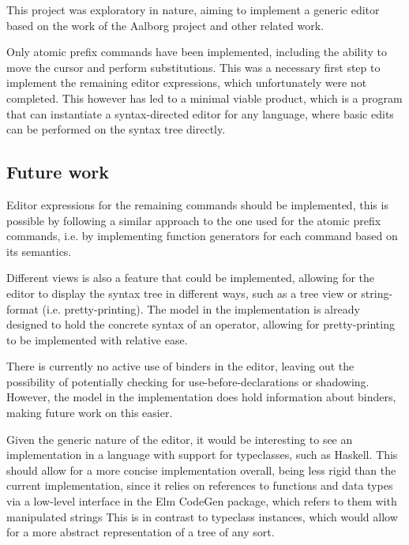 This project was exploratory in nature, aiming to implement a generic editor
based on the work of the Aalborg project\cite{aalborg} and other related work.

Only atomic prefix commands have been implemented, including the ability to
move the cursor and perform substitutions. This was a necessary first step
to implement the remaining editor expressions, which unfortunately were not
completed. This however has led to a minimal viable product, which is a
program that can instantiate a syntax-directed editor for any language, where basic edits can be performed on the syntax tree directly.

\subsection{Future work}
Editor expressions for the remaining commands should be implemented, this is possible by following a similar approach to the one used for the atomic prefix commands, i.e. by implementing function generators for each command based on its semantics.


Different views is also a feature that could be implemented, allowing for the editor to display the syntax tree in different ways, such as a tree view or string-format (i.e. pretty-printing). The model in the implementation is already designed to hold the concrete syntax of an operator, allowing for pretty-printing to be implemented with relative ease.

There is currently no active use of binders in the editor, leaving 
out the possibility of potentially checking for use-before-declarations or 
shadowing. However, the model in the implementation does hold information about binders, making future work on this easier.

Given the generic nature of the editor, it would be interesting to see
an implementation in a language with support for typeclasses, such as Haskell.
This should allow for a more concise implementation overall, being less rigid
than the current implementation, since it relies on references to functions and
data types via a low-level interface in the Elm CodeGen package, which refers
to them with manipulated strings
This is in contrast to typeclass
instances, which would allow for a more abstract representation of a tree
of any sort.


